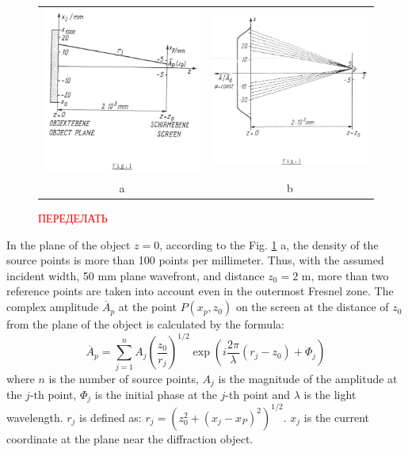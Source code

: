 \documentclass{aip-cp}
\begin{document}
\begin{figure}
\begin{tabular}{cc}
    {\includegraphics[width=160pt]{figures/fig1.png}}
    &{\includegraphics[width=160pt]{figures/fig3.png}}\\ a&b
\end{tabular}
\caption{\textcolor{red}{ПЕРЕДЕЛАТЬ}}
\label{Formulation}
\end{figure}

In the plane of the object $z=0$, according to the Fig. \ref{Formulation} a, the density of the source points is more than 100 points per millimeter. Thus, with the assumed incident width, 50 mm plane wavefront, and distance $z_0 = 2$ m, more than two reference points are taken into account even in the outermost Fresnel zone. The complex amplitude $\overline{A}_p$ at the point $P{(x_p, z_0)}$ on the screen at the distance of $z_0$ from the plane of the object is calculated by the formula:
\begin{equation}
\overline{A}_p = \sum_{j=1}^{n} A_j \left(\frac{z_0}{r_j} \right)^{1/2} \exp \left(i \frac{2\pi}{\lambda} \left(r_j - z_0\right) + \Phi_j\right)
\end{equation}
where $n$ is the number of source points, $A_j$ is the magnitude of the amplitude at the $j$-th point, $\Phi_j$ is the initial phase at the $j$-th point and $\lambda$ is the light wavelength. $r_j$ is  defined as: $r_j = \left(z_0^2 + \left(x_j - x_P\right)^2\right)^{1/2}$. $x_j$ is the current coordinate at the plane near the diffraction object.
\end{document}
